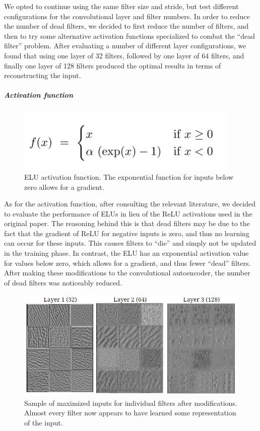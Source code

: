 \documentclass{article}
\begin{document}
We opted to continue using the same filter size and stride, but test different configurations for the convolutional layer and filter numbers. In order to reduce the number of dead filters, we decided to first reduce the number of filters, and then to try some alternative activation functions specialized to combat the “dead filter” problem. After evaluating a number of different layer configurations, we found that using one layer of 32 filters, followed by one layer of 64 filters, and finally one layer of 128 filters produced the optimal results in terms of reconstructing the input. 
\subparagraph{Activation function}
\begin{figure}
\includegraphics{elu}
\caption{ELU activation function. The exponential function for inputs below zero allows for a gradient.}
\end{figure}
As for the activation function, after consulting the relevant literature, we decided to evaluate the performance of ELUs in lieu of the ReLU activations used in the original paper. The reasoning behind this is that dead filters may be due to the fact that the gradient of ReLU for negative inputs is zero, and thus no learning can occur for these inputs. This causes filters to “die” and simply not be updated in the training phase. In contrast, the ELU has an exponential activation value for values below zero, which allows for a gradient, and thus fewer “dead” filters. After making these modifications to the convolutional autoencoder, the number of dead filters was noticeably reduced.
\begin{figure}
\includegraphics{inputs_optimized}
\caption{Sample of maximized inputs for individual filters after modifications. Almost every filter now appears to have learned some representation of the input.}
\end{figure}
\end{document}
